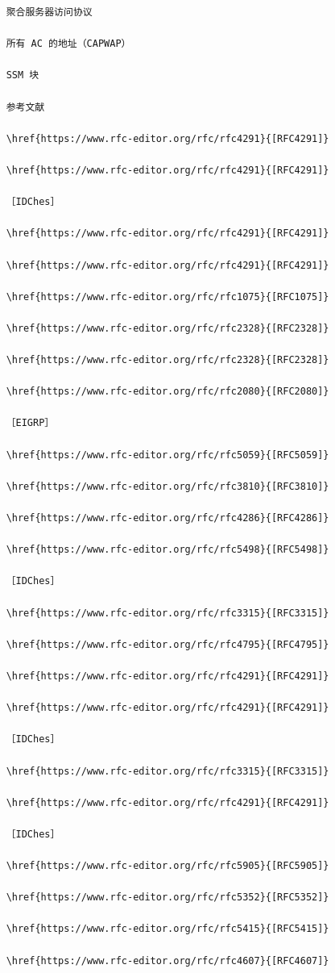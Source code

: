 \begin{verbatim}
    聚合服务器访问协议
    
    所有 AC 的地址（CAPWAP）
    
    SSM 块
    
    参考文献
    
    \href{https://www.rfc-editor.org/rfc/rfc4291}{[RFC4291]}
    
    \href{https://www.rfc-editor.org/rfc/rfc4291}{[RFC4291]}
    
    ［IDChes］
    
    \href{https://www.rfc-editor.org/rfc/rfc4291}{[RFC4291]}
    
    \href{https://www.rfc-editor.org/rfc/rfc4291}{[RFC4291]}
    
    \href{https://www.rfc-editor.org/rfc/rfc1075}{[RFC1075]}
    
    \href{https://www.rfc-editor.org/rfc/rfc2328}{[RFC2328]}
    
    \href{https://www.rfc-editor.org/rfc/rfc2328}{[RFC2328]}
    
    \href{https://www.rfc-editor.org/rfc/rfc2080}{[RFC2080]}
    
    ［EIGRP］
    
    \href{https://www.rfc-editor.org/rfc/rfc5059}{[RFC5059]}
    
    \href{https://www.rfc-editor.org/rfc/rfc3810}{[RFC3810]}
    
    \href{https://www.rfc-editor.org/rfc/rfc4286}{[RFC4286]}
    
    \href{https://www.rfc-editor.org/rfc/rfc5498}{[RFC5498]}
    
    ［IDChes］
    
    \href{https://www.rfc-editor.org/rfc/rfc3315}{[RFC3315]}
    
    \href{https://www.rfc-editor.org/rfc/rfc4795}{[RFC4795]}
    
    \href{https://www.rfc-editor.org/rfc/rfc4291}{[RFC4291]}
    
    \href{https://www.rfc-editor.org/rfc/rfc4291}{[RFC4291]}
    
    ［IDChes］
    
    \href{https://www.rfc-editor.org/rfc/rfc3315}{[RFC3315]}
    
    \href{https://www.rfc-editor.org/rfc/rfc4291}{[RFC4291]}
    
    ［IDChes］
    
    \href{https://www.rfc-editor.org/rfc/rfc5905}{[RFC5905]}
    
    \href{https://www.rfc-editor.org/rfc/rfc5352}{[RFC5352]}
    
    \href{https://www.rfc-editor.org/rfc/rfc5415}{[RFC5415]}
    
    \href{https://www.rfc-editor.org/rfc/rfc4607}{[RFC4607]}
\end{verbatim}

